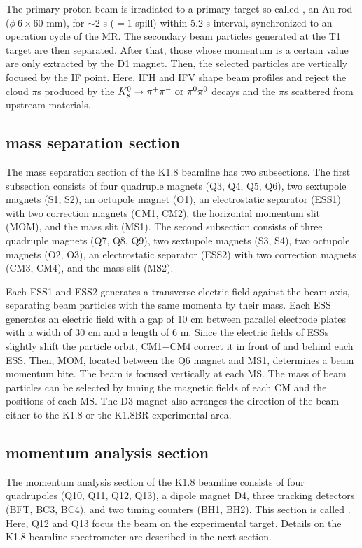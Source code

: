 The primary proton beam is irradiated to a primary target so-called , an Au rod ($\phi\ 6\times60$ mm), for $\sim2$ s ($=1$ spill) within 5.2 s interval, synchronized to an operation cycle of the MR. The secondary beam particles generated at the T1 target are then separated. After that, those whose momentum is a certain value are only extracted by the D1 magnet. Then, the selected particles are vertically focused by the IF point. Here, IFH and IFV shape beam profiles and reject the cloud $\pi$s produced by the $K^0_s \to \pi^+ \pi^-\ \rm{or}\ \pi^0 \pi^0$ decays and the $\pi$s scattered from upstream materials.

\subsection{mass separation section}
The mass separation section of the K1.8 beamline has two subsections. The first subsection consists of four quadruple magnets (Q3, Q4, Q5, Q6), two sextupole magnets (S1, S2), an octupole magnet (O1), an electrostatic separator (ESS1) with two correction magnets (CM1, CM2), the horizontal momentum slit (MOM), and the mass slit (MS1). The second subsection consists of three quadruple magnets (Q7, Q8, Q9), two sextupole magnets (S3, S4), two octupole magnets (O2, O3), an electrostatic separator (ESS2) with two correction magnets (CM3, CM4), and the mass slit (MS2). 

Each ESS1 and ESS2 generates a transverse electric field against the beam axis, separating beam particles with the same momenta by their mass. Each ESS generates an electric field with a gap of 10 cm between parallel electrode plates with a width of 30 cm and a length of 6 m. Since the electric fields of ESSs slightly shift the particle orbit, CM1$-$CM4 correct it in front of and behind each ESS. Then, MOM, located between the Q6 magnet and MS1, determines a beam momentum bite. The beam is focused vertically at each MS. The mass of beam particles can be selected by tuning the magnetic fields of each CM and the positions of each MS. The D3 magnet also arranges the direction of the beam either to the K1.8 or the K1.8BR experimental area. 

\subsection{momentum analysis section}
The momentum analysis section of the K1.8 beamline consists of four quadrupoles (Q10, Q11, Q12, Q13), a dipole magnet D4, three tracking detectors (BFT, BC3, BC4), and two timing counters (BH1, BH2). This section is called . Here, Q12 and Q13 focus the beam on the experimental target. Details on the K1.8 beamline spectrometer are described in the next section.


